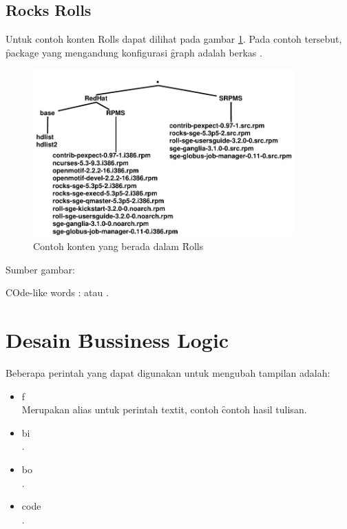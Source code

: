 \subsection{Rocks Rolls}
Untuk contoh konten Rolls dapat dilihat pada gambar \ref{fig:contohisiroll}. Pada contoh tersebut, \f{package} yang mengandung konfigurasi \f{graph} adalah berkas  \citep{paper.jackson}. 


\begin{figure}
	\centering
	\includegraphics[width=0.9\textwidth,height=0.6\textwidth]
		{pics/rollexample.pdf}
	\caption{Contoh konten yang berada dalam \f{Rolls}}
	\label{fig:contohisiroll}
\end{figure}
\begin{center}
{\small Sumber gambar: \citep{paper.jackson}}
\end{center}

COde-like words :  atau  \citep{paper.jackson}. 

\section{Desain \f{Bussiness Logic}}
Beberapa perintah yang dapat digunakan untuk mengubah tampilan adalah: 
\begin{itemize}
	\item \bslash f \\
		Merupakan alias untuk perintah \bslash textit, contoh 
		\f{contoh hasil tulisan}.
	\item \bslash bi \\
		.
	\item \bslash bo \\
		.
	\item \bslash code \\ 
		.
\end{itemize}

